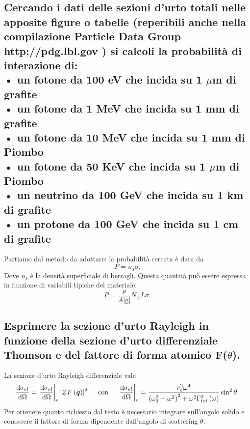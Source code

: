 \subsection[\hspace{1mm} Probabilità di interazione di fotoni nel Piombo]{Cercando i dati delle sezioni d’urto totali nelle apposite figure o tabelle (reperibili anche nella compilazione Particle Data Group http://pdg.lbl.gov ) si calcoli la probabilità di interazione di:\\
• un fotone da 100 eV che incida su 1 $\mu$m di grafite\\
• un fotone da 1 MeV che incida su 1 mm di grafite\\
• un fotone da 10 MeV che incida su 1 mm di Piombo\\
• un fotone da 50 KeV che incida su 1 $\mu$m di Piombo\\
• un neutrino da 100 GeV che incida su 1 km di grafite\\
• un protone da 100 GeV che incida su 1 cm di grafite\\
}
\label{sec:4.b.23}
Partiamo dal metodo da adottare: la probabilità cercata è data da
\[
	P = n_{s}\sigma
.\] Dove $n_{s}$ è la densità superficiale di bersagli. Questa quantità può essere espressa in funzione di variabili tipiche del materiale:
\[
	P = \frac{\rho}{A \text{[g]}}N_{A}L\sigma
.\] 
\subsection[\hspace{1mm} Sezione d'urto Rayleigh in funzione della sezione d'urto differenziale Thompson e di $F\left( \bs{q} \right) $]{Esprimere la sezione d'urto Rayleigh in funzione della sezione d'urto differenziale Thomson e del fattore di forma atomico F($\theta$).
}
\label{sec:4.b.24}
La sezione d'urto Rayleigh differenziale vale
\[
	\frac{\mbox{d} \sigma_{el}}{\mbox{d} \Omega}= \left.\frac{\mbox{d} \sigma_{el}}{\mbox{d} \Omega} \right|_{e} \left| Z F\left( \boldsymbol{q} \right)  \right|^2 \quad
		\text{ con }
	\quad
	\left.\frac{\mbox{d} \sigma_{el }}{\mbox{d} \Omega} \right|_{e}= 
		\frac{r_e^2\omega^4}{\left( \omega_0^2-\omega^2 \right)^2 + \omega^2\Gamma_{tot}^2\left( \omega \right)} \sin^2\theta 
.\] 
Per ottenere quanto richiesto dal testo è necessario integrare sull'angolo solido e conoscere il fattore di forma dipendente dall'angolo di scattering $\theta$.

